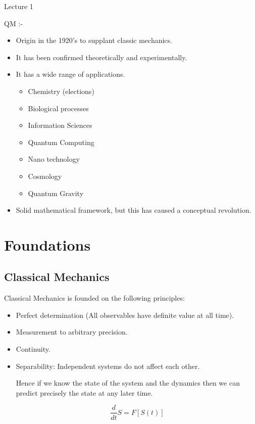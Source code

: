 \begin{center}

Lecture 1

\end{center}

QM :- 

\begin{itemize}

\item Origin in the 1920's to supplant classic mechanics. 
\item It has been confirmed theoretically and experimentally.
\item It has a wide range of applications.
	\begin{itemize}
	\item Chemistry (elections)
	\item Biological processes
	\item Information Sciences
	\item Quantum Computing
	\item Nano technology
	\item Cosmology
	\item Quantum Gravity
	\end{itemize}

\item Solid mathematical framework, but this has caused a conceptual revolution.

\end{itemize}

\section{Foundations}

\subsection{Classical Mechanics}

Classical Mechanics is founded on the following principles:

\begin{itemize}

\item Perfect determination (All observables have definite value at all time).

\item Measurement to arbitrary precision.

\item Continuity.

\item Separability: Independent systems do not affect each other.

Hence if we know the state of the system and the dynamics then we can predict precisely the state at any later time. 

$$ \frac{d}{dt} S = F[S(t)] $$

\end{itemize}

